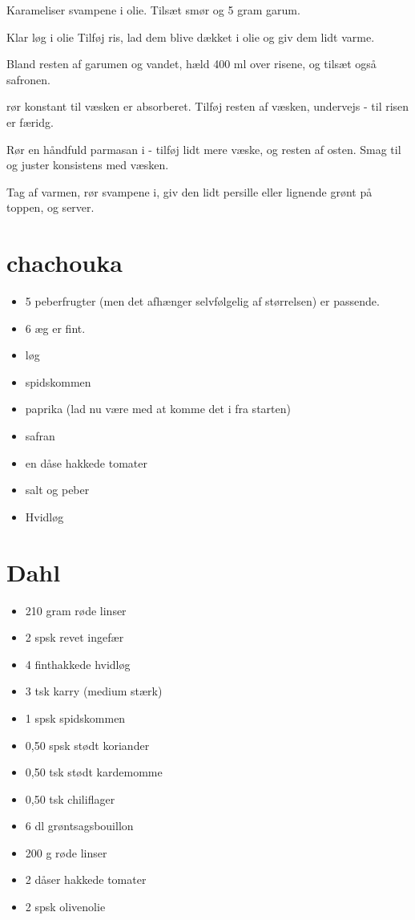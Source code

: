 \documentclass[
]{book}
\providecommand{\tightlist}{%
  \setlength{\itemsep}{0pt}\setlength{\parskip}{0pt}}
\begin{document}
Karameliser svampene i olie.
Tilsæt smør og 5 gram garum.

Klar løg i olie
Tilføj ris, lad dem blive dækket i olie og giv dem lidt varme.

Bland resten af garumen og vandet, hæld 400 ml over risene, og
tilsæt også safronen.

rør konstant til væsken er absorberet. Tilføj resten af
væsken, undervejs - til risen er færidg.

Rør en håndfuld parmasan i - tilføj lidt mere væske, og
resten af osten. Smag til og juster konsistens med væsken.

Tag af varmen, rør svampene i, giv den lidt persille eller lignende
grønt på toppen, og server.

\hypertarget{chachouka}{%
\section{chachouka}\label{chachouka}}

\begin{itemize}
\tightlist
\item
  5 peberfrugter (men det afhænger selvfølgelig af størrelsen) er passende.
\item
  6 æg er fint.
\item
  løg
\item
  spidskommen
\item
  paprika (lad nu være med at komme det i fra starten)
\item
  safran
\item
  en dåse hakkede tomater
\item
  salt og peber
\item
  Hvidløg
\end{itemize}

\hypertarget{dahl}{%
\section{Dahl}\label{dahl}}

\begin{itemize}
\tightlist
\item
  210 gram røde linser
\item
  2 spsk revet ingefær
\item
  4 finthakkede hvidløg
\item
  3 tsk karry (medium stærk)
\item
  1 spsk spidskommen
\item
  0,50 spsk stødt koriander
\item
  0,50 tsk stødt kardemomme
\item
  0,50 tsk chiliflager
\item
  6 dl grøntsagsbouillon
\item
  200 g røde linser
\item
  2 dåser hakkede tomater
\item
  2 spsk olivenolie
\end{itemize}
\end{document}
